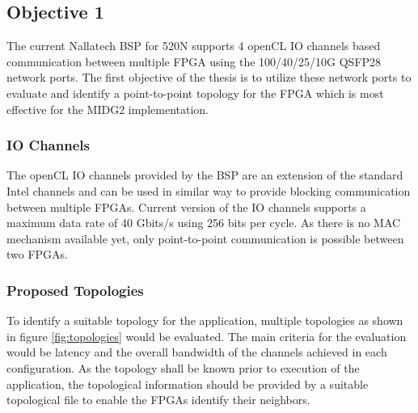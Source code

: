 \documentclass[english,notitlepage]{hgbreport}
\begin{document}
\subsection{Objective 1}

The current Nallatech BSP for 520N supports 4 openCL IO channels based communication between
multiple FPGA using the 100/40/25/10G QSFP28 network ports. The first objective of
the thesis is to utilize these network ports to evaluate and identify a point-to-point
topology for the FPGA which is most effective for the MIDG2 implementation.

\subsubsection{IO Channels}

The openCL IO channels provided by the BSP are an extension of the standard Intel channels \cite{noauthor_intel_2018}
and can be used in similar way to provide blocking communication between multiple FPGAs.
Current version of the IO channels supports a maximum data rate of 40 Gbits/s using 256 bits per cycle.
As there is no MAC mechanism available yet, only point-to-point communication is possible between
two FPGAs.

\subsubsection{Proposed Topologies}

To identify a suitable topology for the application, multiple topologies
as shown in figure \ref{fig:topologies} would be evaluated. The main criteria for the evaluation
would be latency and the overall bandwidth of the channels achieved in each
configuration. As the topology shall be known prior to execution of the application,
the topological information should be provided by a suitable topological file
to enable the FPGAs identify their neighbors.
\end{document}
